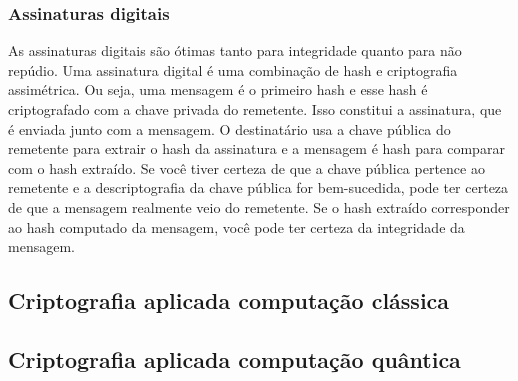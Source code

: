 \subsubsection{Assinaturas digitais}
As assinaturas digitais são ótimas tanto para integridade quanto para não repúdio. Uma assinatura digital é uma combinação de hash e criptografia assimétrica. Ou seja, uma mensagem é o primeiro hash e esse hash é criptografado com a chave privada do remetente. Isso constitui a assinatura, que é enviada junto com a mensagem.
O destinatário usa a chave pública do remetente para extrair o hash da assinatura e a mensagem é hash para comparar com o hash extraído. Se você tiver certeza de que a chave pública pertence ao remetente e a descriptografia da chave pública for bem-sucedida, pode ter certeza de que a mensagem realmente veio do remetente. Se o hash extraído corresponder ao hash computado da mensagem, você pode ter certeza da integridade da mensagem.

\subsection{Criptografia aplicada computação clássica}
\subsection{Criptografia aplicada computação quântica}